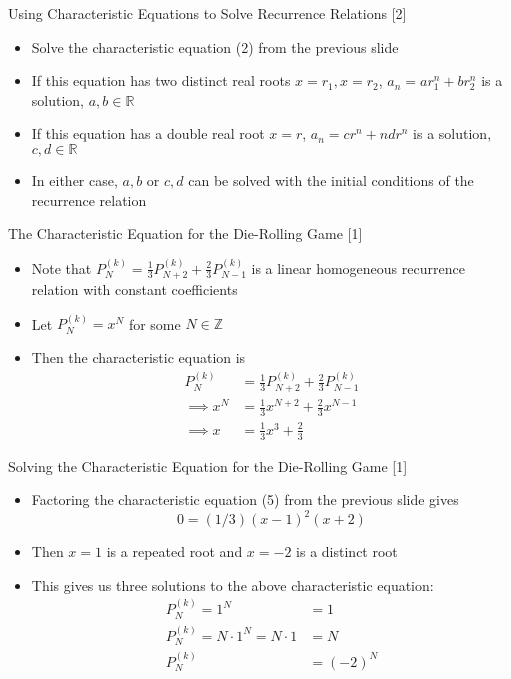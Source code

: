\documentclass[14pt]{beamer}
\begin{document}
\begin{frame}{Using Characteristic Equations to Solve Recurrence Relations [2]}
 \begin{itemize}
     \item Solve the characteristic equation (2) from the previous slide
     \item If this equation has two distinct real roots $x = r_1, x = r_2$,  $a_{n} = ar_{1}^{n} + br_{2}^{n}$ is a solution, $a,b \in \mathbb{R}$
     \item If this equation has a double real root $x = r$, $a_{n} = cr^{n} + ndr^{n}$ is a solution, $c,d \in \mathbb{R}$
     \item In either case, $a,b$ or $c,d$ can be solved with the initial conditions of the recurrence relation
 \end{itemize} 
\end{frame}

\begin{frame}{The Characteristic Equation for the Die-Rolling Game [1]}
 \begin{itemize}
     \item Note that $P^{(k)}_N = \frac{1}{3}P^{(k)}_{N+2} + \frac{2}{3}P^{(k)}_{N-1}$ is a linear homogeneous recurrence relation with constant coefficients
     \item Let $P^{(k)}_N = x^N$ for some $N \in \mathbb{Z}$
     \item Then the characteristic equation is 
        \begin{align}
            P^{(k)}_N &= \frac{1}{3}P^{(k)}_{N+2} + \frac{2}{3}P^{(k)}_{N-1} \\
            \implies x^N &= \frac{1}{3} x^{N+2} + \frac{2}{3} x^{N-1} \\
            \implies x &= \frac{1}{3} x^3 + \frac{2}{3}
\end{align}
 \end{itemize}
\end{frame}

\begin{frame}{Solving the Characteristic Equation for the Die-Rolling Game [1]}
 \begin{itemize}
     \item Factoring the characteristic equation (5) from the previous slide gives 
     $$0 = (1/3)(x - 1)^2(x + 2)$$
     \item Then $x = 1$ is a repeated root and $x = -2$ is a distinct root
     \item This gives us three solutions to the above characteristic equation:
        \begin{align}
            P^{(k)}_N = 1^N &= 1 \\
            P^{(k)}_N = N \cdot 1^N = N \cdot 1 &= N \\
            P^{(k)}_N &= (-2)^N
        \end{align}
 \end{itemize} 
\end{frame}
\end{document}

